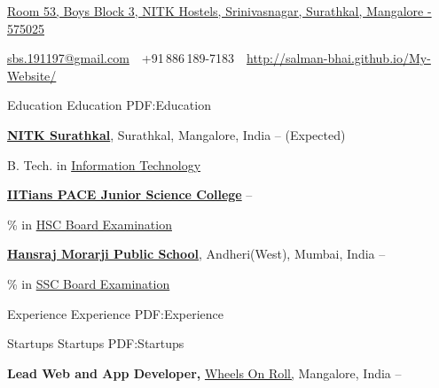 \documentclass[letterpaper,MMMyyyy,nonstopmode]{simpleresumecv}
\newcommand{\CVAuthor}{Salman Shah}
\newcommand{\CVWebpage}{http://salman-bhai.github.io/My-Website/}
\begin{document}

\Title{\CVAuthor}

\begin{SubTitle}
\href{https://www.google.co.in/maps/search/3rd+Block,+National+Institute+of+Technology,+Dodda+Kopla,+Surathkal,+Karnataka+575025/@13.0125878,74.798059,15z/data=!3m1!4b1}
{Room 53, Boys Block 3, NITK Hostels, Srinivasnagar, Surathkal, Mangalore - 575025}
\par
\href{mailto:sbs.191197@gmail.com}
{sbs.191197@gmail.com}
\,\SubBulletSymbol\,
+91\,886\,189-7183
\,\SubBulletSymbol\,
\href{\CVWebpage}
{\url{\CVWebpage}}
\end{SubTitle}

\begin{Body}


\Section
{Education}
{Education}
{PDF:Education}

\Entry
\href{http://nitk.ac.in/}
{\textbf{NITK Surathkal}},
Surathkal, Mangalore, India
\hfill
{} --
(Expected)

\Gap
\BulletItem
B. Tech. in 
\href{http://infotech.nitk.ac.in/}
{Information Technology}

\Gap
\Entry
\href{http://www.iitianspace.com/}
{\textbf{IITians PACE Junior Science College}}
\hfill
{} --

\Gap
{}\% in 
\href{http://www.example.com/my-department}
{HSC Board Examination}

\Gap
\Entry
\href{http://www.hansrajeducation.org/}
{\textbf{Hansraj Morarji Public School}},
Andheri(West), Mumbai, India
\hfill
{} --

\Gap
{}\% in
\href{http://www.example.com/my-department}
{SSC Board Examination}
\begin{Detail}
\end{Detail}


\Section
{Experience}
{Experience}
{PDF:Experience}

\SubSection
{Startups}
{Startups}
{PDF:Startups}

\Entry
\textbf{Lead Web and App Developer,}
\href{http://wheelsonroll.com/}
{Wheels On Roll,}
Mangalore, India
\hfill
{} --


\end{Body}
\end{document}
